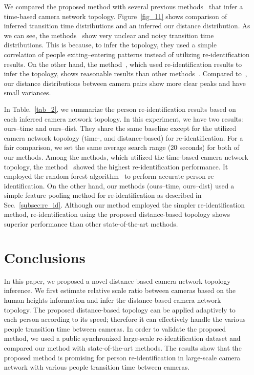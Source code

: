 \documentclass[10pt,twocolumn,letterpaper]{article}
\begin{document}
		We compared the proposed method with several previous methods~\cite{makris2004bridging, niu2006recovering, chen2014object, martinel2016person,	cai2010recovering ,	Cho_2017_ICCV_Workshops} that infer a time-based camera network topology.
		Figure~\ref{fig_11} shows comparison of inferred transition time distributions and an inferred our distance distribution. 
		As we can see, the methods~\cite{makris2004bridging, niu2006recovering, chen2014object} show very unclear and noisy transition time distributions. This is because, to infer the topology, they used a simple correlation of people exiting--entering patterns instead of utilizing re-identification results.
		On the other hand, the method~\cite{Cho_2017_ICCV_Workshops}, which used re-identification results to infer the topology, shows reasonable results than other methods~\cite{makris2004bridging, niu2006recovering, chen2014object}.
		Compared to~\cite{Cho_2017_ICCV_Workshops}, our distance distributions between camera pairs show more clear peaks and have small variances.
		
		In Table.~\ref{tab_2}, we summarize the person re-identification results based on each inferred camera network topology.
		In this experiment, we have two results: ours--time and ours--dist. They share the same baseline except for the utilized camera network topology (time-, and distance-based) for re-identification.
		For a fair comparison, we set the same average search range (20 seconds) for both of our methods.
		Among the methods, which utilized the time-based camera network topology, the method~\cite{Cho_2017_ICCV_Workshops} showed the highest re-identification performance.
		It employed the random forest algorithm~\cite{breiman2001random} to perform accurate person re-identification.
		On the other hand, our methods (ours--time, ours--dist) used a simple feature pooling method for re-identification as described in Sec.~\ref{subsec:re_id}.
		Although our method employed the simpler re-identification method, re-identification using the proposed distance-based topology shows superior performance than other state-of-the-art methods.
		
		
		
		
		\section{Conclusions}
		\label{sec:conclusion} 
		
		In this paper, we proposed a novel distance-based camera network topology inference. 
		We first estimate relative scale ratio between cameras based on the human heights information and infer the distance-based camera network topology. The proposed distance-based topology can be applied adaptively to each person according to its speed; therefore it can effectively handle the various people transition time between cameras. In order to validate the proposed method, we used a public synchronized large-scale re-identification dataset and compared our method with state-of-the-art methods. 
		The results show that the proposed method is promising for person re-identification in large-scale camera network with various people transition time between cameras.
		
		{\small
			
			
		}
		
		
	
\end{document}
